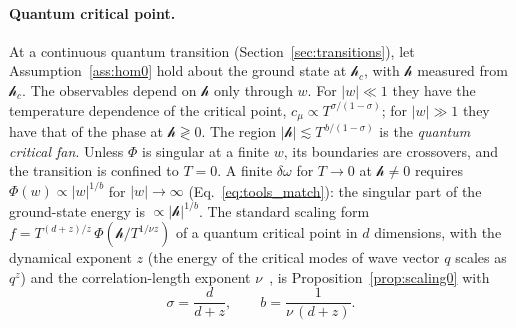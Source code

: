 \documentclass[10pt,a4paper]{article}
\theoremstyle{plain}
\newcommand{\hfield}{\mathscr{h}}  %
\begin{document}
\paragraph{Quantum critical point.} At a continuous quantum transition
(Section~\ref{sec:transitions}), let Assumption~\ref{ass:hom0} hold about
the ground state at $\hfield_c$, with $\hfield$ measured from $\hfield_c$.
The observables depend on $\hfield$ only through $w$. For $|w|\ll1$ they have
the temperature dependence of the critical point,
$c_\mu\propto T^{\sigma/(1-\sigma)}$; for $|w|\gg1$ they have that of the
phase at $\hfield\gtrless0$. The region $|\hfield|\lesssim T^{\,b/(1-\sigma)}$
is the \emph{quantum critical fan}. Unless $\Phi$ is singular at a finite
$w$, its boundaries are crossovers, and the transition is confined to $T=0$.
A finite $\delta\omega$ for $T\to0$ at $\hfield\neq0$ requires
$\Phi(w)\propto|w|^{1/b}$ for $|w|\to\infty$ (Eq.~\eqref{eq:tools_match}):
the singular part of the ground-state energy is $\propto|\hfield|^{1/b}$. The
standard scaling form $f=T^{(d+z)/z}\,\Phi(\hfield/T^{1/\nu z})$ of a quantum
critical point in $d$ dimensions, with the dynamical exponent $z$ (the
energy of the critical modes of wave vector $q$ scales as $q^{z}$) and the
correlation-length exponent $\nu$~\cite{Lohneysen2007}, is
Proposition~\ref{prop:scaling0} with
\begin{equation}\label{eq:filt_qcp}
  \sigma=\frac{d}{d+z} ,\qquad b=\frac{1}{\nu\,(d+z)} .
\end{equation}
\end{document}
